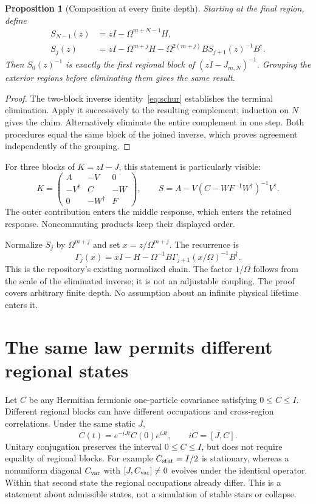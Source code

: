 \documentclass[11pt]{article}
\newtheorem{proposition}{Proposition}
\begin{document}
\begin{proposition}[Composition at every finite depth]\label{prop:schur}
Starting at the final region, define
\begin{align}
 S_{N-1}(z)&=zI-\Omega^{m+N-1}H,\\
 S_j(z)&=zI-\Omega^{m+j}H
 -\Omega^{2(m+j)}B S_{j+1}(z)^{-1}B^\dagger.
\end{align}
Then $S_0(z)^{-1}$ is exactly the first regional block of
$(zI-J_{m,N})^{-1}$. Grouping the exterior regions before eliminating them
gives the same result.
\end{proposition}
\begin{proof}
The two-block inverse identity~\eqref{eq:schur} establishes the terminal
elimination. Apply it successively to the resulting complement; induction
on $N$ gives the claim. Alternatively eliminate the entire complement in
one step. Both procedures equal the same block of the joined inverse,
which proves agreement independently of the grouping.
\end{proof}
For three blocks of $K=zI-J$, this statement is particularly visible:
\begin{equation}
 K=\begin{pmatrix}A&-V&0\\-V^\dagger&C&-W\\0&-W^\dagger&F\end{pmatrix},
 \qquad S=A-V(C-WF^{-1}W^\dagger)^{-1}V^\dagger.
\end{equation}
The outer contribution enters the middle response, which enters the retained
response. Noncommuting products keep their displayed order.

Normalize $S_j$ by $\Omega^{m+j}$ and set $x=z/\Omega^{m+j}$. The recurrence is
\begin{equation}\label{eq:recursion}
 \Gamma_j(x)=xI-H-\Omega^{-1}B\Gamma_{j+1}(x/\Omega)^{-1}B^\dagger.
\end{equation}
This is the repository's existing normalized chain. The factor $1/\Omega$
follows from the scale of the eliminated inverse; it is not an adjustable
coupling. The proof covers arbitrary finite depth. No assumption about an
infinite physical lifetime enters it.

\section{The same law permits different regional states}
Let $C$ be any Hermitian fermionic one-particle covariance satisfying
$0\leq C\leq I$. Different regional blocks can have different occupations
and cross-region correlations. Under the same static $J$,
\begin{equation}\label{eq:state}
 C(t)=e^{-iJt}C(0)e^{iJt},\qquad i\dot C=[J,C].
\end{equation}
Unitary conjugation preserves the interval $0\leq C\leq I$, but does not
require equality of regional blocks. For example $C_{\rm stat}=I/2$ is
stationary, whereas a nonuniform diagonal $C_{\rm var}$ with
$[J,C_{\rm var}]\ne0$ evolves under the identical operator. Within that
second state the regional occupations already differ. This is a statement
about admissible states, not a simulation of stable stars or collapse.
\end{document}
